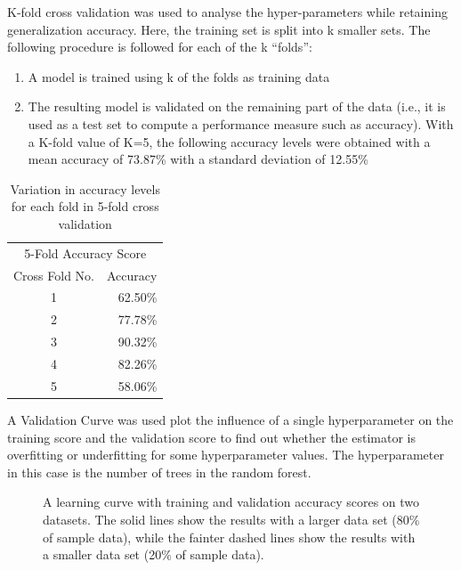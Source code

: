 \documentclass[a4paper,twoside,12pt]{report}
\begin{document}
K-fold cross validation was used to analyse the hyper-parameters while retaining generalization accuracy.   Here, the training set is split into k smaller sets. The following procedure is followed for each of the k “folds”:
\begin{enumerate}
\item A model is trained using k of the folds as training data

\item The resulting model is validated on the remaining part of the data (i.e., it is used as a test set to compute a performance measure such as accuracy). With a K-fold value of K=5, the following accuracy levels were obtained with a mean accuracy of 73.87\% with a standard deviation of 12.55\%
\end{enumerate}

\begin{table} [!htbp]
  \centering
\begin{tabular}{cr}
\hline
\multicolumn{2}{c}{5-Fold Accuracy Score} \\
\cline{1-2}
 Cross Fold No. & Accuracy \\
\hline
 1    & 62.50\%      \\
 2       & 77.78\%      \\
 3     & 90.32\%    \\
 4      & 82.26\%      \\
 5     & 58.06\%  \\
\hline
\end{tabular}
\caption{Variation in accuracy levels for each fold in 5-fold cross validation}
\end{table}

A Validation Curve was used plot the influence of a single hyperparameter on the training score and the validation score to find out whether the estimator is overfitting or underfitting for some hyperparameter values.  The hyperparameter in this case is the number of trees in the random forest.

\begin{figure} [!htbp]
\centering
  \hfill
\caption[Validation Curve for Random Forest classifier] {A learning curve with training and validation accuracy scores on two datasets.   The solid lines show the results with a larger data set (80\% of sample data), while the fainter dashed lines show the results with a smaller data set (20\% of sample data).  }
\end{figure}
\end{document}
